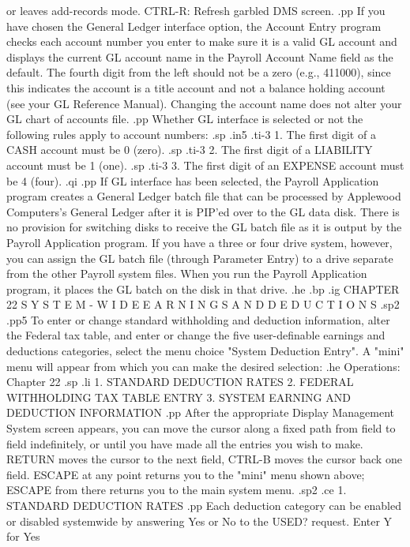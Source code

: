 		    or leaves add-records mode.
	    CTRL-R: Refresh garbled DMS screen.
.pp
If you have chosen the General Ledger interface option, the Account
Entry program checks each account number you enter to make sure it
is a valid GL account and displays
the current GL account name in the
Payroll Account Name field as the default.  The fourth digit from the
left should not be a zero (e.g., 411000), since this indicates the
account is a title account and not a balance holding account (see your
GL Reference Manual).
Changing the account name
does not alter your GL chart of accounts file.
.pp
Whether GL interface is selected or not the following rules apply
to account numbers:
.sp
.in5
.ti-3
1. The first digit of a CASH account must be 0 (zero).
.sp
.ti-3
2. The first digit of a LIABILITY account must be 1 (one).
.sp
.ti-3
3. The first digit of an EXPENSE account must be 4 (four).
.qi
.pp
If GL interface has been selected, the Payroll Application program
creates a General Ledger batch file that can be processed by
Applewood Computers's General Ledger after it is PIP'ed over to the GL data disk.
There is no provision for switching disks to receive the GL batch
file as it is output by the Payroll Application program.  If you have
a three or four drive system, however, you can assign the GL batch
file (through Parameter Entry) to a drive separate from the other
Payroll system files.  When you run the Payroll Application program,
it places the GL batch on the disk in that drive.
.he
.bp
.ig
CHAPTER 22
S Y S T E M - W I D E
E A R N I N G S   A N D   D E D U C T I O N S
.sp2
.pp5
To enter or change standard withholding and deduction information,
alter the Federal tax table, and enter or change the five user-definable
earnings and deductions categories, select the menu choice "System
Deduction Entry".  A "mini" menu will appear from which you can make the
desired selection:
.he Operations: Chapter 22
.sp
.li
	1. STANDARD DEDUCTION RATES
	2. FEDERAL WITHHOLDING TAX TABLE ENTRY
	3. SYSTEM EARNING AND DEDUCTION INFORMATION
.pp
After the appropriate Display Management System screen appears, you can
move the cursor along a fixed path from field to field indefinitely,
or until you have made all the entries you wish to make.  RETURN moves
the cursor to the next field, CTRL-B moves the cursor back one field.
ESCAPE at any point returns you to the "mini" menu shown above; ESCAPE
from there returns you to the main system menu.
.sp2
.ce
1. STANDARD DEDUCTION RATES
.pp
Each deduction category can be enabled or disabled systemwide by answering
Yes or No
to the USED? request.  Enter Y for Yes

